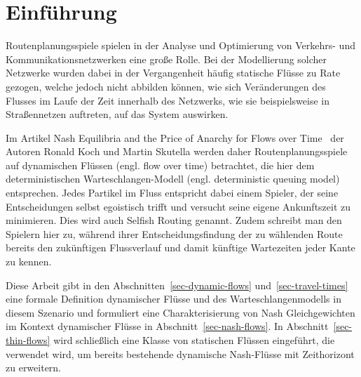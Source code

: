 \chapter{Einführung}\label{introduction}

Routenplanungsspiele spielen in der Analyse und Optimierung von Verkehrs- und Kommunikationsnetzwerken eine große Rolle.
Bei der Modellierung solcher Netzwerke wurden dabei in der Vergangenheit häufig statische Flüsse zu Rate gezogen, welche jedoch nicht abbilden können, wie sich Veränderungen des Flusses im Laufe der Zeit innerhalb des Netzwerks, wie sie beispielsweise in Straßennetzen auftreten, auf das System auswirken.

Im Artikel \glqq Nash Equilibria and the Price of Anarchy for Flows over Time\grqq\ \cite{Koch2011} der Autoren Ronald Koch und Martin Skutella werden daher Routenplanungsspiele auf dynamischen Flüssen (engl. flow over time) betrachtet, die hier dem deterministischen Warte\-schlangen-Modell (engl. deterministic queuing model) entsprechen.
Jedes Partikel im Fluss entspricht dabei einem Spieler, der seine Entscheidungen selbst egoistisch trifft und versucht seine eigene Ankunftszeit zu minimieren.
Dies wird auch Selfish Routing genannt.
Zudem schreibt man den Spielern hier zu, während ihrer Entscheidungsfindung der zu wählenden Route bereits den zukünftigen Flussverlauf und damit künftige Wartezeiten jeder Kante zu kennen.

Diese Arbeit gibt in den Abschnitten~\ref{sec-dynamic-flows} und~\ref{sec-travel-times} eine formale Definition dynamischer Flüsse und des Warteschlangenmodells in diesem Szenario und formuliert eine Charakterisierung von Nash Gleichgewichten im Kontext dynamischer Flüsse in Abschnitt~\ref{sec-nash-flows}.
In Abschnitt~\ref{sec-thin-flows} wird schließlich eine Klasse von statischen Flüssen eingeführt, die verwendet wird, um bereits bestehende dynamische Nash-Flüsse mit Zeithorizont zu erweitern.